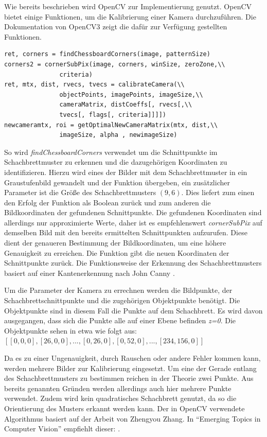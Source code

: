 Wie bereits beschrieben wird OpenCV  zur Implementierung genutzt. OpenCV bietet einige Funktionen, um die Kalibrierung einer Kamera durchzuführen. Die Dokumentation von OpenCV3 \autocite{Opencv3Camera2016} zeigt die dafür zur Verfügung gestellten Funktionen. 
\begin{lstlisting}[frame=single]
ret, corners = findChessboardCorners(image, patternSize) 
corners2 = cornerSubPix(image, corners, winSize, zeroZone,\\
               criteria) 
ret, mtx, dist, rvecs, tvecs = calibrateCamera(\\
               objectPoints, imagePoints, imageSize,\\
               cameraMatrix, distCoeffs[, rvecs[,\\
               tvecs[, flags[, criteria]]]]) 
newcameramtx, roi = getOptimalNewCameraMatrix(mtx, dist,\\
               imageSize, alpha , newimageSize)
\end{lstlisting}
So wird \textit{findChessboardCorners} verwendet um die Schnittpunkte im Schachbrettmuster zu erkennen und die dazugehörigen Koordinaten zu identifizieren. Hierzu wird eines der Bilder mit dem Schachbrettmuster in ein Graustufenbild gewandelt und der Funktion übergeben, ein zusätzlicher Parameter ist die Größe des Schachbrettmusters $(9,6)$. Dies liefert zum einen den Erfolg der Funktion als Boolean zurück und zum anderen die Bildkoordinaten der gefundenen Schnittpunkte. 
Die gefundenen Koordinaten sind allerdings nur approximierte Werte, daher ist es empfehlenswert \textit{cornerSubPix} auf demselben Bild mit den bereits ermittelten Schnittpunkten aufzurufen. Diese dient der genaueren Bestimmung der Bildkoordinaten, um eine höhere Genauigkeit zu erreichen. Die Funktion gibt die neuen Koordinaten der Schnittpunkte zurück. 
Die Funktionsweise der Erkennung des Schachbrettmusters basiert auf einer Kantenerkennung nach John Canny \autocite{canny1986}.

Um die Parameter der Kamera zu errechnen werden die Bildpunkte, der Schachbrettschnittpunkte und die zugehörigen Objektpunkte benötigt. Die Objektpunkte sind in diesem Fall die Punkte auf dem Schachbrett. Es wird davon ausgegangen, dass sich die Punkte alle auf einer Ebene befinden \textit{z=0}. Die Objektpunkte sehen in etwa wie folgt aus: $[[0,0,0], [26,0,0],...,[0,26,0],[0,52,0],...,[234,156,0]]$

Da es zu einer Ungenauigkeit, durch Rauschen oder andere Fehler kommen kann, werden mehrere Bilder zur Kalibrierung eingesetzt. Um eine der Gerade entlang des Schachbrettmusters zu bestimmen reichen in der Theorie zwei Punkte. Aus bereits genannten Gründen werden allerdings auch hier mehrere Punkte verwendet. Zudem wird kein quadratisches Schachbrett genutzt, da so die Orientierung des Musters erkannt werden kann. 
Der in OpenCV verwendete Algorithmus basiert auf der Arbeit von Zhengyou Zhang. In "`Emerging Topics in Computer Vision"' \autocite{Medioni:2004:ETC:993884} empfiehlt dieser:  \autocite[24]{Zhang2000}.


